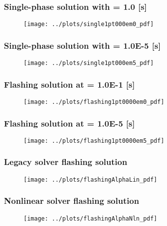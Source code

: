\documentclass[compress,xcolor=table]{beamer}
\begin{document}
\begin{frame}
\frametitle{Single-phase solution with \dtmax{} = 1.0 {[s]}}

\begin{figure}[h!t]
\centering
\texttt{[image: ../plots/single1pt000em0\_pdf]}
\end{figure}

\end{frame}
\begin{frame}
\frametitle{Single-phase solution with \dtmax{} = 1.0E-5 {[s]}}

\begin{figure}[h!t]
\centering
\texttt{[image: ../plots/single1pt000em5\_pdf]}
\end{figure}

\end{frame}
\begin{frame}
\frametitle{Flashing solution at \dtmax{} = 1.0E-1 {[s]}}

\begin{figure}[h!t]
\centering
\texttt{[image: ../plots/flashing1pt0000em0\_pdf]}
\end{figure}

\end{frame}
\begin{frame}
\frametitle{Flashing solution at \dtmax{} = 1.0E-5 {[s]}}

\begin{figure}[h!t]
\centering
\texttt{[image: ../plots/flashing1pt0000em5\_pdf]}
\end{figure}

\end{frame}
\begin{frame}
\frametitle{Legacy solver flashing solution}

\begin{figure}[h!t]
\centering
\texttt{[image: ../plots/flashingAlphaLin\_pdf]}
\end{figure}

\end{frame}
\begin{frame}
\frametitle{Nonlinear solver flashing solution}

\begin{figure}[h!t]
\centering
\texttt{[image: ../plots/flashingAlphaNln\_pdf]}
\end{figure}

\end{frame}
\end{document}
